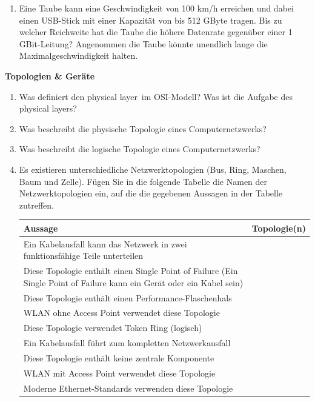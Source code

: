 \documentclass[paper=a4,fontsize=11pt]{scrartcl}%
\numberwithin{equation}{section}
\begin{document}
{\begin{enumerate}
\item Eine Taube kann eine Geschwindigkeit von 100 km/h erreichen und dabei einen USB-Stick mit einer Kapazität von bis 512 GByte tragen. Bis zu welcher Reichweite hat die Taube die höhere Datenrate gegenüber einer 1 GBit-Leitung? Angenommen die Taube könnte unendlich lange die Maximalgeschwindigkeit halten.
\end{enumerate}

\begin{center}\Large{\textbf{Topologien \& Geräte}}\end{center}\vskip0.25in
\begin{enumerate}
\item Was definiert den \glqq physical layer\grqq\ im OSI-Modell? Was ist die Aufgabe des \glqq physical layers\grqq?
\item Was beschreibt die physische Topologie eines Computernetzwerks?
\item  Was beschreibt die logische Topologie eines Computernetzwerks?
\item Es existieren unterschiedliche Netzwerktopologien (Bus, Ring, Maschen,
Baum und Zelle). Fügen Sie in die folgende Tabelle die Namen der Netzwerktopologien
ein, auf die die gegebenen Aussagen in der Tabelle zutreffen.
\begin{table}[H]
\begin{tabularx}{\linewidth}{|L|c|} \hline
 Aussage & Topologie(n) \\ \hline
 Ein Kabelausfall kann das Netzwerk in zwei funktionsfähige Teile unterteilen & \\ \hline
 Diese Topologie enthält einen Single Point of Failure \newline
 (Ein Single Point of Failure kann ein Gerät oder ein Kabel sein) & \\ \hline
 Diese Topologie enthält einen Performance-Flaschenhals  & \\ \hline
 WLAN ohne Access Point verwendet diese Topologie & \\ \hline
 Diese Topologie verwendet Token Ring (logisch) & \\ \hline
 Ein Kabelausfall führt zum kompletten Netzwerkausfall & \\ \hline
 Diese Topologie enthält keine zentrale Komponente & \\ \hline
 WLAN mit Access Point verwendet diese Topologie & \\ \hline
 Moderne Ethernet-Standards verwenden diese Topologie & \\ \hline

\end{tabularx}
\end{table}
\end{enumerate}}
\end{document}
